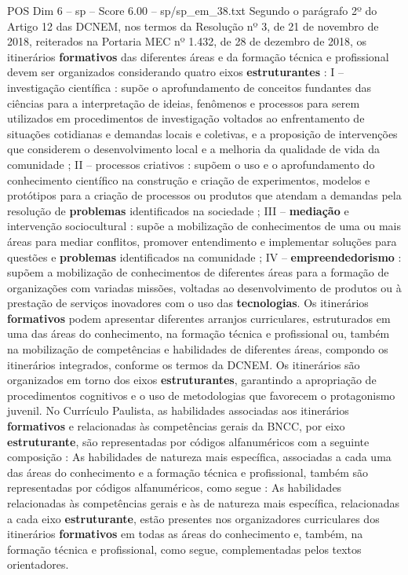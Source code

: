 \begin{textsample}{POS Dim 6 – sp – Score 6.00 – sp/sp\_em\_38.txt}
Segundo o parágrafo 2º do Artigo 12 das DCNEM, nos termos da Resolução nº 3, de 21 de novembro de 2018, reiterados na Portaria MEC nº 1.432, de 28 de dezembro de 2018, os itinerários \textbf{formativos} das diferentes áreas e da formação técnica e profissional devem ser organizados considerando quatro eixos \textbf{estruturantes} : I – investigação científica : supõe o aprofundamento de conceitos fundantes das ciências para a interpretação de ideias, fenômenos e processos para serem utilizados em procedimentos de investigação voltados ao enfrentamento de situações cotidianas e demandas locais e coletivas, e a proposição de intervenções que considerem o desenvolvimento local e a melhoria da qualidade de vida da comunidade ; II – processos criativos : supõem o uso e o aprofundamento do conhecimento científico na construção e criação de experimentos, modelos e protótipos para a criação de processos ou produtos que atendam a demandas pela resolução de \textbf{problemas} identificados na sociedade ; III – \textbf{mediação} e intervenção sociocultural : supõe a mobilização de conhecimentos de uma ou mais áreas para mediar conflitos, promover entendimento e implementar soluções para questões e \textbf{problemas} identificados na comunidade ; IV – \textbf{empreendedorismo} : supõem a mobilização de conhecimentos de diferentes áreas para a formação de organizações com variadas missões, voltadas ao desenvolvimento de produtos ou à prestação de serviços inovadores com o uso das \textbf{tecnologias}.
Os itinerários \textbf{formativos} podem apresentar diferentes arranjos curriculares, estruturados em uma das áreas do conhecimento, na formação técnica e profissional ou, também na mobilização de competências e habilidades de diferentes áreas, compondo os itinerários integrados, conforme os termos da DCNEM.
Os itinerários são organizados em torno dos eixos \textbf{estruturantes}, garantindo a apropriação de procedimentos cognitivos e o uso de metodologias que favorecem o protagonismo juvenil.
No Currículo Paulista, as habilidades associadas aos itinerários \textbf{formativos} e relacionadas às competências gerais da BNCC, por eixo \textbf{estruturante}, são representadas por códigos alfanuméricos com a seguinte composição : As habilidades de natureza mais específica, associadas a cada uma das áreas do conhecimento e a formação técnica e profissional, também são representadas por códigos alfanuméricos, como segue : As habilidades relacionadas às competências gerais e às de natureza mais específica, relacionadas a cada eixo \textbf{estruturante}, estão presentes nos organizadores curriculares dos itinerários \textbf{formativos} em todas as áreas do conhecimento e, também, na formação técnica e profissional, como segue, complementadas pelos textos orientadores.

\end{textsample}
